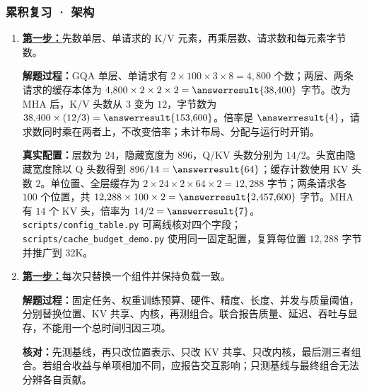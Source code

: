 \subsubsection*{累积复习 · 架构}
\begin{enumerate}[label={},leftmargin=4.8em,itemsep=4pt]
\item[\textbf{R-13.}] \leavevmode{}\label{solution:R-13}\label{solution:review-gqa-budget}\hyperref[exercise:review-gqa-budget]{\textbf{第一步：}}先数单层、单请求的 K/V 元素，再乘层数、请求数和每元素字节数。\par\nobreak
\textbf{解题过程：}GQA 单层、单请求有 $2\times100\times3\times8=4{,}800$ 个数；两层、两条请求的缓存本体为 $4{,}800\times2\times2\times2=\answerresult{38{,}400}$ 字节。改为 MHA 后，K/V 头数从 $3$ 变为 $12$，字节数为 $38{,}400\times(12/3)=\answerresult{153{,}600}$。倍率是 $\answerresult{4}$，请求数同时乘在两者上，不改变倍率；未计布局、分配与运行时开销。
\par\textbf{真实配置：}层数为 $24$，隐藏宽度为 $896$，Q/KV 头数分别为 $14/2$。头宽由隐藏宽度除以 Q 头数得到 $896/14=\answerresult{64}$；缓存计数使用 KV 头数 $2$。单位置、全层缓存为 $2\times24\times2\times64\times2=12{,}288$ 字节；两条请求各 $100$ 个位置，共 $12{,}288\times100\times2=\answerresult{2{,}457{,}600}$ 字节。MHA 有 $14$ 个 KV 头，倍率为 $14/2=\answerresult{7}$。\texttt{scripts/config\_table.py} 可离线核对四个字段；\texttt{scripts/cache\_budget\_demo.py} 使用同一固定配置，复算每位置 $12{,}288$ 字节并推广到 32K。
\item[\textbf{R-14.}] \leavevmode{}\label{solution:R-14}\label{solution:review-architecture-ablation}\hyperref[exercise:review-architecture-ablation]{\textbf{第一步：}}每次只替换一个组件并保持负载一致。\par\nobreak\textbf{解题过程：}固定任务、权重训练预算、硬件、精度、长度、并发与质量阈值，分别替换位置、KV 共享、内核，再测组合。联合报告质量、延迟、吞吐与显存，不能用一个总时间归因三项。\par\textbf{核对：}先测基线，再只改位置表示、只改 KV 共享、只改内核，最后测三者组合。若组合收益与单项相加不同，应报告交互影响；只测基线与最终组合无法分辨各自贡献。
\end{enumerate}
